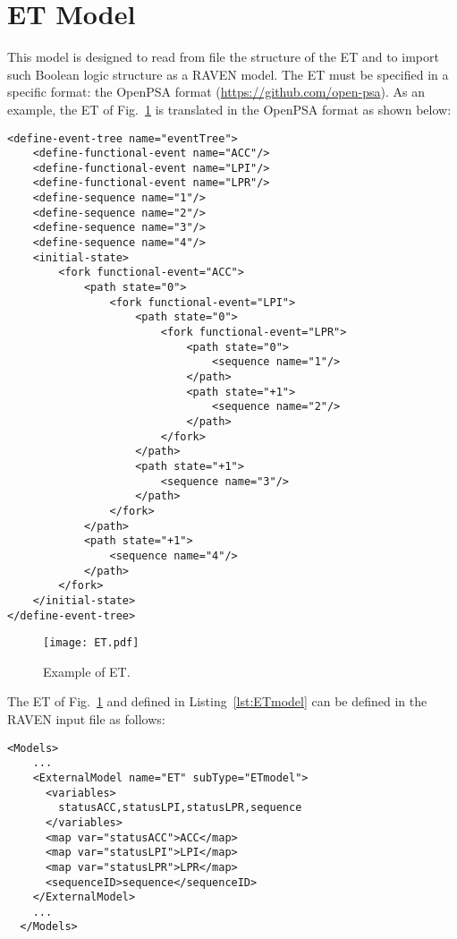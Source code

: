 \section{ET Model}
\label{sec:ETmodel}

This model is designed to read from file the structure of the ET and to import such Boolean logic structure as a RAVEN model.
The ET must be specified in a specific format: the OpenPSA format (\href{<url>}{https://github.com/open-psa}). 
As an example, the ET of Fig.~\ref{fig:ET} is translated in the OpenPSA format as shown below:

\begin{lstlisting}[style=XML,morekeywords={anAttribute},caption=ET of Fig.~\ref{fig:ET} in OpenPSA format., label=lst:ETmodel]
<define-event-tree name="eventTree">
    <define-functional-event name="ACC"/>
    <define-functional-event name="LPI"/>
    <define-functional-event name="LPR"/>
    <define-sequence name="1"/>
    <define-sequence name="2"/>
    <define-sequence name="3"/>
    <define-sequence name="4"/>
    <initial-state>
        <fork functional-event="ACC">
            <path state="0">
                <fork functional-event="LPI">
                    <path state="0">
                        <fork functional-event="LPR">
                            <path state="0">
                                <sequence name="1"/>
                            </path>
                            <path state="+1">
                                <sequence name="2"/>
                            </path>
                        </fork>
                    </path>
                    <path state="+1">
                        <sequence name="3"/>
                    </path>
                </fork>
            </path>
            <path state="+1">
                <sequence name="4"/>
            </path>
        </fork>
    </initial-state>
</define-event-tree>
\end{lstlisting} 

\begin{figure}
    \centering
    \centerline{\texttt{[image: ET.pdf]}} 
    \caption{Example of ET.}
    \label{fig:ET}
\end{figure}

The ET of Fig.~\ref{fig:ET} and defined in Listing~\ref{lst:ETmodel} can be defined in the RAVEN input file as follows:
\begin{lstlisting}[style=XML,morekeywords={anAttribute},caption=ET model input example., label=lst:ET_InputExample]
  <Models> 
    ...
    <ExternalModel name="ET" subType="ETmodel">
      <variables>
        statusACC,statusLPI,statusLPR,sequence
      </variables>
      <map var="statusACC">ACC</map>
      <map var="statusLPI">LPI</map>
      <map var="statusLPR">LPR</map>
      <sequenceID>sequence</sequenceID>
    </ExternalModel>
    ...
  </Models>
\end{lstlisting}


